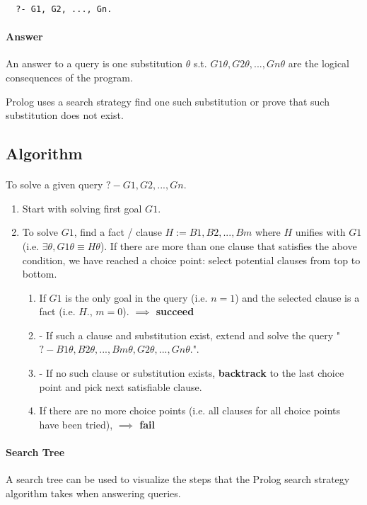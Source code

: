 \documentclass{article}
\begin{document}
\begin{multicols}{2}
  \begin{lstlisting}
  ?- G1, G2, ..., Gn.
  \end{lstlisting}
  
  \paragraph{Answer} An answer to a query is one substitution $\theta$ s.t. $G1\theta, G2\theta, ..., Gn\theta$ are the logical consequences of the program.
  
  Prolog uses a search strategy find one such substitution or prove that such substitution does not exist.
  
  \subsection{Algorithm}
  
  \paragraph{} To solve a given query $?- G1, G2, ..., Gn.$
  
  \begin{enumerate}
  \item Start with solving first goal $G1$.
  \item To solve $G1$, find a fact / clause $H := B1, B2, ..., Bm$ where $H$ unifies with $G1$ (i.e. $\exists\theta, G1\theta \equiv H\theta$). If there are more than one clause that satisfies the above condition, we have reached a choice point: select potential clauses from top to bottom. 
  \begin{enumerate}
  \item If $G1$ is the only goal in the query (i.e. $n=1$) and the selected clause is a fact (i.e. $H.$, $m=0$). {\bf $\implies$ succeed}
  \item - If such a clause and substitution exist, extend and solve the query "$?- B1\theta, B2\theta, ..., Bm\theta, G2\theta, ..., Gn\theta.$".
  \item - If no such clause or substitution exists, {\bf backtrack} to the last choice point and pick next satisfiable clause.
  \item If there are no more choice points (i.e. all clauses for all choice points have been tried), {\bf $\implies$ fail}
  \end{enumerate}
  \end{enumerate}
  
  \paragraph{Search Tree} A search tree can be used to visualize the steps that the Prolog search strategy algorithm takes when answering queries.
  

\end{multicols}
\end{document}
